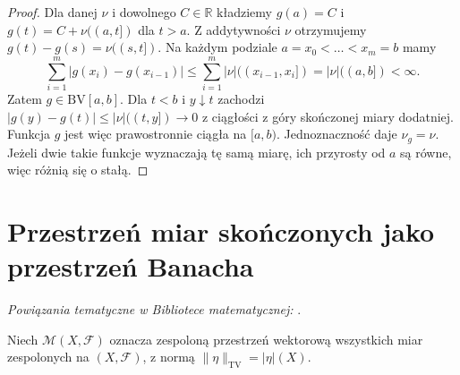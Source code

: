 \begin{proof}
Dla danej $\nu$ i dowolnego $C\in\mathbb{R}$ kładziemy
$g(a)=C$ i $g(t)=C+\nu((a,t])$ dla $t>a$.
Z addytywności $\nu$ otrzymujemy
$g(t)-g(s)=\nu((s,t])$. Na każdym podziale
$a=x_0<\dots<x_m=b$ mamy
\[
 \sum_{i=1}^m|g(x_i)-g(x_{i-1})|
 \le\sum_{i=1}^m|\nu|((x_{i-1},x_i])
 =|\nu|((a,b])<\infty.
\]
Zatem $g\in\mathrm{BV}[a,b]$.
Dla $t<b$ i $y\downarrow t$ zachodzi
$|g(y)-g(t)|\le|\nu|((t,y])\to0$
z ciągłości z góry skończonej miary dodatniej.
Funkcja $g$ jest więc prawostronnie ciągła na $[a,b)$.
Jednoznaczność daje $\nu_g=\nu$. Jeżeli dwie takie
funkcje wyznaczają tę samą miarę, ich przyrosty
od $a$ są równe, więc różnią się o stałą.
\end{proof}

\section{Przestrzeń miar skończonych jako przestrzeń Banacha}

\noindent\emph{Powiązania tematyczne w Bibliotece matematycznej:} .

\begin{definicja}
\label{def:complex-measures-space-16}
Niech $\mathcal M(X,\mathcal F)$ oznacza zespoloną
przestrzeń wektorową wszystkich miar zespolonych
na $(X,\mathcal F)$, z normą
$\|\eta\|_{\mathrm{TV}}=|\eta|(X)$.
\end{definicja}

